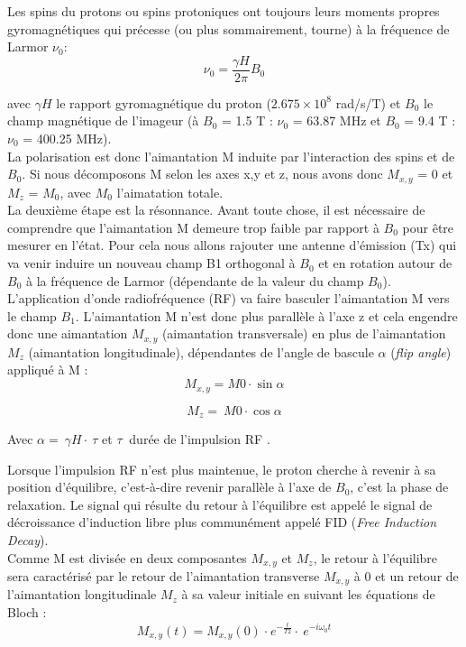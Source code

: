  Les spins du protons ou spins protoniques ont toujours leurs moments propres gyromagnétiques qui précesse (ou plus sommairement, tourne) à la fréquence de Larmor $\nu_0$: 
 \begin{equation}
 \nonumber
  \nu_0 =\frac{\gamma H}{2 \pi}B_0
 \end{equation}
 
 avec $\gamma H$ le rapport gyromagnétique du proton ($2.675×10^8$ rad/s/T) et $B_0$ le champ magnétique de l’imageur (à $B_0$ = 1.5 T :  $\nu_0$ = 63.87 MHz et $B_0$ = 9.4 T : $\nu_0$ = 400.25 MHz). 
 \\
 La polarisation est donc l’aimantation M induite par l’interaction des spins et de $B_0$. Si nous décomposons M selon les axes x,y et z, nous avons donc $M_{x,y}$ = 0 et $M_z$ = $M_0$, avec $M_0$ l’aimatation totale. 
\\
La deuxième étape est la résonnance. Avant toute chose, il est nécessaire de comprendre que l’aimantation M demeure trop faible  par rapport à $B_0$ pour être mesurer en l’état. Pour cela nous allons rajouter une antenne d’émission (Tx) qui va venir induire un nouveau champ B1 orthogonal à $B_0$ et en rotation autour de $B_0$ à la fréquence de Larmor (dépendante de la valeur du champ $B_0$).  L’application d’onde radiofréquence (RF) va faire basculer l’aimantation M vers le champ $B_1$. L’aimantation M n’est donc plus parallèle à l’axe z et cela engendre donc une aimantation $M_{x,y}$ (aimantation transversale) en plus de l’aimantation $M_z$ (aimantation longitudinale), dépendantes de l’angle de bascule $\alpha$ (\textit{flip angle}) appliqué à M :
\begin{equation}
\nonumber
	M_{x,y} = M0 \cdot \sin{\alpha}
\end{equation}

\begin{equation}
\nonumber
	M_z =\ M0 \cdot \cos{\alpha}
\end{equation}

Avec $\alpha =\ \gamma H\cdot \ \tau$ et $\tau\ $ durée de l’impulsion RF \cite{Ernst1966}.

Lorsque l’impulsion RF n’est plus maintenue, le proton cherche à revenir à sa position d’équilibre, c’est-à-dire revenir parallèle à l’axe de  $B_0$, c’est la phase de relaxation. Le signal qui résulte du retour à l’équilibre est appelé le signal de décroissance d’induction libre plus communément appelé FID (\textit{Free Induction Decay}).
\\
Comme M est divisée en deux composantes $M_{x,y}$  et $M_z$, le retour à l’équilibre sera caractérisé par le retour de l’aimantation transverse $M_{x,y}$  à 0 et un retour de l’aimantation longitudinale $M_z$ à sa valeur initiale en suivant les équations de Bloch \cite{HolgerFrsterling2009}:
\begin{equation}
\nonumber
	M_{x,y}\left(t\right)=M_{x,y}\left(0\right)\ {\cdot\ e}^{-\frac{t}{T2}}\cdot\ e^{-i\omega_0t}
	\end{equation}

